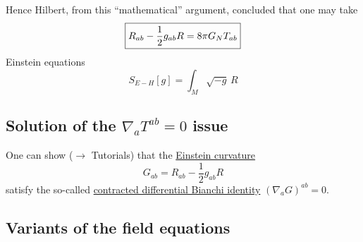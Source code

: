 Hence Hilbert, from this ``mathematical'' argument, concluded that one may take
\[
\boxed{ R_{ab} - \frac{1}{2} g_{ab} R = 8 \pi G_N T_{ab} }  \\
\]
Einstein equations
\[
S_{E-H}[g] = \int_M \sqrt{-g} \, R
\]

\subsection{Solution of the $\nabla_a T^{ab} =0$ issue}
One can show ($\to$ Tutorials) that the \underline{Einstein curvature}
\[
G_{ab} = R_{ab} - \frac{1}{2} g_{ab}R
\]
satisfy the so-called \underline{contracted differential Bianchi identity} $(\nabla_a G)^{ab} = 0$.

\subsection{Variants of the field equations}
